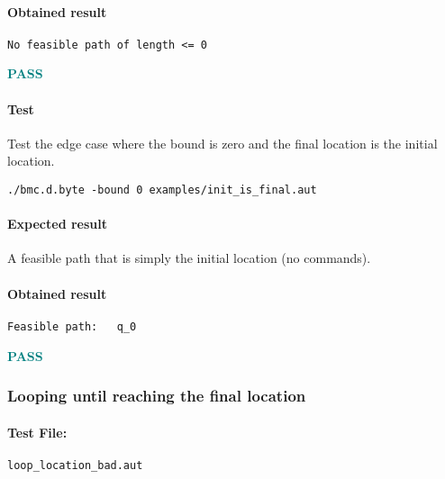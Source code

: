\documentclass[letterpaper,12pt]{article}
\begin{document}
\paragraph{Obtained result}
\begin{verbatim}
No feasible path of length <= 0
\end{verbatim}
\textbf{\textcolor{teal}{PASS}}


\paragraph{Test}
Test the edge case where the bound is zero and the final location is the initial location.
\begin{verbatim}
./bmc.d.byte -bound 0 examples/init_is_final.aut 
\end{verbatim}
\paragraph{Expected result}
A feasible path that is simply the initial location (no commands).
\paragraph{Obtained result}
\begin{verbatim}
Feasible path:   q_0
\end{verbatim}
\textbf{\textcolor{teal}{PASS}}




\subsubsection{Looping until reaching the final location}\label{loop-to-final}

  
\paragraph{Test File:} \texttt{loop\_location\_bad.aut}
\end{document}
